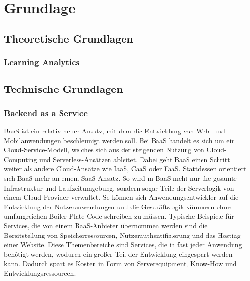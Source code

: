 \chapter{Grundlage} %
\section{Theoretische Grundlagen}
\subsection{Learning Analytics}

\section{Technische Grundlagen}

\subsection{Backend as a Service}
\ac{BaaS} ist ein relativ neuer Ansatz, mit dem die Entwicklung von Web- und Mobilanwendungen beschleunigt werden soll.
Bei \ac{BaaS} handelt es sich um ein Cloud-Service-Modell, welches sich aus der steigenden Nutzung von Cloud-Computing und Serverless-Ansätzen ableitet.
Dabei geht \ac{BaaS} einen Schritt weiter als andere Cloud-Ansätze wie \ac{IaaS}, \ac{CaaS} oder \ac{FaaS}.
Stattdessen orientiert sich \ac{BaaS} mehr an einem \ac{SaaS}-Ansatz. %
So wird in \ac{BaaS} nicht nur die gesamte Infrastruktur und Laufzeitumgebung, sondern sogar Teile der Serverlogik von einem Cloud-Provider verwaltet.\autocite[Vgl.][]{cloudflareBaaS}
So können sich Anwendungsentwickler auf die Entwicklung der Nutzeranwendungen und die Geschäftslogik kümmern ohne umfangreichen Boiler-Plate-Code schreiben zu müssen.
Typische Beispiele für Services, die von einem \ac{BaaS}-Anbieter übernommen werden sind die Bereitstellung von Speicherressourcen, Nutzerauthentifizierung und das Hosting einer Website.
Diese Themenbereiche sind Services, die in fast jeder Anwendung benötigt werden, wodurch ein großer Teil der Entwicklung eingespart werden kann.
Dadurch spart es Kosten in Form von Serverequipment, Know-How und Entwicklungsressourcen.


